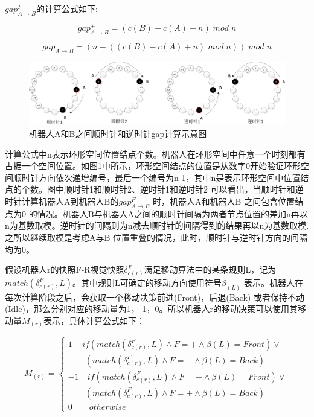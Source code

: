 $gap_{A \rightarrow B}^F$的计算公式如下:

$$gap_{A \rightarrow B}^+ = \left(c \left( B \right) - c \left( A \right) + n\right) \;  mod \; n $$

$$gap_{A \rightarrow B}^- = \left(n - \left( \left( c \left( B \right) -  c \left( A \right) +n\right) \; mod \; n \right) \right) \; mod \; n $$

\begin{figure}[!hbt]
	\centering
	\includegraphics[width=6 in]{fig/gap.png}
	\caption{机器人A和B之间顺时针和逆时针gap计算示意图}
	\label{fig:gap}
\end{figure}

计算公式中n表示环形空间位置结点个数。机器人在环形空间中任意一个时刻都有占据一个空间位置。如图\ref{fig:gap}中所示，环形空间结点的位置是从数字0开始验证环形空间顺时针方向依次递增编号，最后一个编号为n-1，其中n是表示环形空间中位置结点的个数。图中顺时针1和顺时针2、逆时针1和逆时针2 可以看出，当顺时针和逆时针计算机器人A到机器人B的$gap_{A \rightarrow B}^F$ 时，机器人A和机器人B 之间包含位置结点为0 的情况。机器人B与机器人A之间的顺时针间隔为两者节点位置的差加n再以n为基数取模。逆时针的间隔则为n减去顺时针的间隔得到的结果再以n为基数取模.之所以继续取模是考虑A与B 位置重叠的情况，此时，顺时针与逆时针方向的间隔均为0。

假设机器人r的快照F-R视觉快照$\delta_{c\left( r \right)}^F$满足移动算法中的某条规则L，记为$match\left(\delta_{c\left( r \right)}^F,L\right)$。其中规则L可确定的移动方向使用符号$\beta_{\left(L\right)}$ 表示。机器人在每次计算阶段之后，会获取一个移动决策前进(Front)，后退(Back) 或者保持不动(Idle)，那么分别对应的移动量为1，-1，0。所以机器人r的移动决策可以使用其移动量$M_{\left(r\right)}$表示，具体计算公式如下：

$$ M_{\left(r\right)} = \left\{
\begin{array}{lcl}
1 \quad \, if \left( match \left( \delta_{c\left(r\right)}^F,L\right) \land F=+ \land \beta\left(L\right) = Front\right) \lor \\ \quad \quad  \left(match \left( \delta_{c\left(r\right)}^F,L\right) \land F=- \land \beta\left(L\right) = Back \right) \\
-1 \quad if \left( match \left( \delta_{c\left(r\right)}^F,L\right) \land F=- \land \beta\left(L\right) = Front\right) \lor \\ \quad \quad  \left(match \left( \delta_{c\left(r\right)}^F,L\right) \land F=+ \land \beta\left(L\right) = Back \right) \\
0 \quad \quad  otherwise
\end{array}
\right. $$

